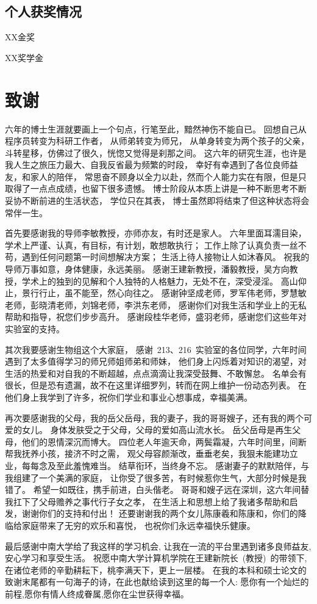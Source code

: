 \subsection*{个人获奖情况}
\noindent
\begin{enumerate}[label={[\arabic*]}]
\item XX金奖
\item XX奖学金
\end{enumerate}
\fi

\newpage

\ifblindreview
\else
\section{致谢} %
六年的博士生涯就要画上一个句点，行笔至此，黯然神伤不能自已。
回想自己从程序员转变为科研工作者，
从师弟转变为师兄，
从单身转变为两个孩子的父亲，
斗转星移，仿佛过了很久，恍惚又觉得是刹那之间。
这六年的研究生涯，也许是我人生之旅压力最大、自我反省最为频繁的时段，
幸好有幸遇到了各位良师益友，和家人的陪伴，
常思奋不顾身以全力以赴，然而个人能力实在有限，但是只取得了一点点成绩，也留下很多遗憾。
博士阶段从本质上讲是一种不断思考不断妥协不断前进的生活状态，
学位只在其表，
博士虽然即将结束了但这种状态将会常伴一生。

首先要感谢我的导师李敏教授，亦师亦友，有时还是家人。
六年里面耳濡目染，学术上严谨、认真，有目标，有计划，敢想敢执行；
工作上除了认真负责一丝不苟，遇到任何问题第一时间想解决方案；
生活上待人接物让人如沐春风。
祝我的导师万事如意，身体健康，永远美丽。
感谢王建新教授，潘毅教授，吴方向教授，学术上的独到的见解和个人独特的人格魅力，无处不在，深受浸淫。
高山仰止，景行行止，虽不能至，然心向往之。
感谢钟坚成老师，罗军伟老师，罗慧敏老师，彭晓清老师，刘锦老师，李洪东老师，
感谢你们对我生活和学业上的无私帮助和指导，祝您们步步高升。
感谢段桂华老师，盛羽老师，感谢您们这些年对实验室的支持。

其次我要感谢生物组这个大家庭，
感谢~213、216~实验室的各位同学，六年时间遇到了太多值得学习的师兄师姐师弟和师妹，
他们身上闪烁着对知识的渴望，对生活的热爱和对自我的不断超越，点点滴滴让我深受鼓舞、不敢懈怠。
名单会有很长，但是恐有遗漏，故不在这里详细罗列，转而在网上维护一份动态列表。
在他们身上我学到了许多，祝你们学业和事业心想事成，幸福美满。

再次要感谢我的父母，我的岳父岳母，我的妻子，我的哥哥嫂子，还有我的两个可爱的女儿。
身体发肤受之于父母，父母的爱如高山流水长。
岳父岳母是再生父母，他们的恩情深沉而博大。
四位老人年逾天命，两鬓霜凝，六年时间里，间断帮我抚养小孩，接济不时之需，
观父母容颜渐改，垂垂老矣，我狠未能建功立业，每每念及至此羞愧难当。
结草衔环，当终身不忘。
感谢妻子的默默陪伴，与我组建了一个美满的家庭，
让你受了很多苦，有时候惹你生气，大部分时候是我错了。
希望一如既往，携手前进，白头偕老。
哥哥和嫂子远在深圳，这六年间替我扛下了父母赡养之事代行子女之孝，
在生活上和思想上给了我诸多帮助和启发，谢谢你们的支持和付出！
还要谢谢我的两个女儿陈康羲和陈康和，你们的降临给家庭带来了无穷的欢乐和喜悦，
也祝你们永远幸福快乐健康。

最后感谢中南大学给了我这样的学习机会, 
让我在一流的平台里遇到诸多良师益友,
安心学习和享受生活。
祝愿中南大学计算机学院在王建新院长~(教授)~的带领下, 
在诸位老师的辛勤耕耘下，桃李满天下，更上一层楼。
在我的本科和硕士论文的致谢末尾都有一句海子的诗，在此也献给读到这里的每一个人:
愿你有一个灿烂的前程,愿你有情人终成眷属,愿你在尘世获得幸福。
\newpage
\fi